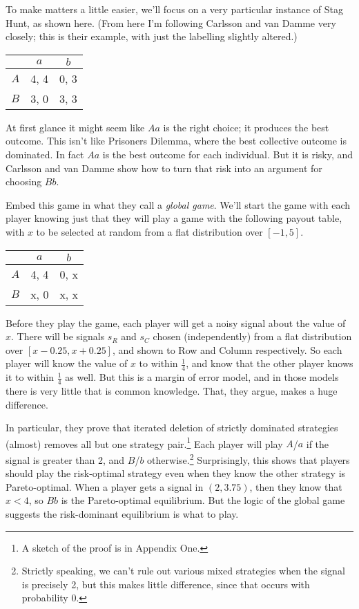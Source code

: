 To make matters a little easier, we'll focus on a very particular instance of Stag Hunt, as shown here. (From here I'm following Carlsson and van Damme very closely; this is their example, with just the labelling slightly altered.)


\begin{center}
\begin{tabular}{r | c c}
& $a$ & $b$  \\\hline
$A$ & 4, 4 & 0, 3 \\
$B$ & 3, 0 & 3, 3
\end{tabular}
\end{center}


At first glance it might seem like $Aa$ is the right choice; it produces the best outcome. This isn't like Prisoners Dilemma, where the best collective outcome is dominated. In fact $Aa$ is the best outcome for each individual. But it is risky, and Carlsson and van Damme show how to turn that risk into an argument for choosing $Bb$.

Embed this game in what they call a \emph{global game}. We'll start the game with each player knowing just that they will play a game with the following payout table, with $x$ to be selected at random from a flat distribution over $[-1, 5]$.


\begin{center}
\begin{tabular}{r | c c}
& $a$ & $b$  \\\hline
$A$ & 4, 4 & 0, x \\
$B$ & x, 0 & x, x
\end{tabular}
\end{center}


Before they play the game, each player will get a noisy signal about the value of $x$. There will be signals $s_R$ and $s_C$ chosen (independently) from a flat distribution over $[x - 0.25, x + 0.25]$, and shown to Row and Column respectively. So each player will know the value of $x$ to within $\frac{1}{4}$, and know that the other player knows it to within $\frac{1}{4}$ as well. But this is a margin of error model, and in those models there is very little that is common knowledge. That, they argue, makes a huge difference.

In particular, they prove that iterated deletion of strictly dominated strategies (almost) removes all but one strategy pair.\footnote{A sketch of the proof is in Appendix One.} Each player will play $A$\slash $a$ if the signal is greater than 2, and $B$\slash $b$ otherwise.\footnote{Strictly speaking, we can't rule out various mixed strategies when the signal is precisely 2, but this makes little difference, since that occurs with probability 0.} Surprisingly, this shows that players should play the risk-optimal strategy even when they know the other strategy is Pareto-optimal. When a player gets a signal in $(2, 3.75)$, then they know that $x < 4$, so $Bb$ is the Pareto-optimal equilibrium. But the logic of the global game suggests the risk-dominant equilibrium is what to play.

